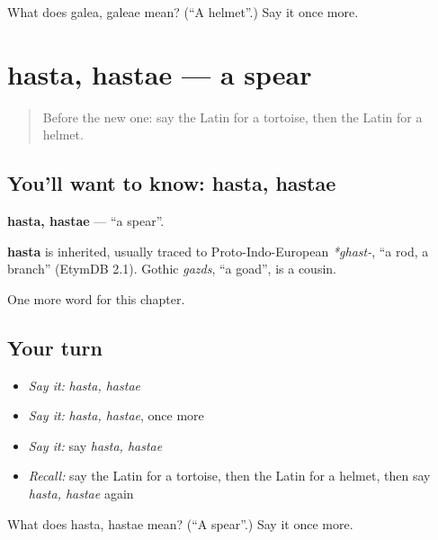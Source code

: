 \begin{tcolorbox}[breakable,colback=teal!4,colframe=teal!35!black,title={Before you move on}]
What does galea, galeae mean? (\textquotedblleft{}A helmet\textquotedblright{}.) Say it once more.
\end{tcolorbox}
\section[hasta, hastae]{hasta, hastae — a spear}

\label{lesson:LA-C277-hasta}



\begin{quote}
Before the new one: say the Latin for a tortoise, then the Latin for a helmet.
\end{quote}

\subsection*{You'll want to know: hasta, hastae}
\textbf{hasta, hastae} — \textquotedblleft{}a spear\textquotedblright{}.

\begin{cousinweb}
\textbf{hasta} is inherited, usually traced to Proto-Indo-European \emph{*ghast-}, \textquotedblleft{}a rod, a branch\textquotedblright{} (EtymDB 2.1). Gothic \emph{gazds}, \textquotedblleft{}a goad\textquotedblright{}, is a cousin.
\end{cousinweb}

\begin{grammarlens}[title={What you've built}]
One more word for this chapter.
\end{grammarlens}

\subsection*{Your turn}
\begin{itemize}
\raggedright
  \item \emph{Say it:} \emph{hasta, hastae}
  \item \emph{Say it:} \emph{hasta, hastae}, once more
  \item \emph{Say it:} say \emph{hasta, hastae}
  \item \emph{Recall:} say the Latin for a tortoise, then the Latin for a helmet, then say \emph{hasta, hastae} again
\end{itemize}

\begin{tcolorbox}[breakable,colback=teal!4,colframe=teal!35!black,title={Before you move on}]
What does hasta, hastae mean? (\textquotedblleft{}A spear\textquotedblright{}.) Say it once more.
\end{tcolorbox}
